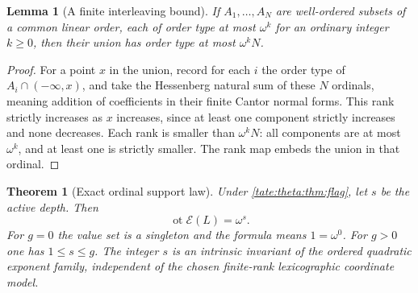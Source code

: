 \documentclass[11pt,letterpaper]{article}
\newtheorem{theorem}{Theorem}[section]
\newtheorem{lemma}[lemma]{Lemma}
\theoremstyle{definition}
\newcommand{\ordtype}{\operatorname{ot}}
\newcommand{\cE}{\mathcal E}
\begin{document}
\begin{lemma}[A finite interleaving bound]\label{tate:theta:lem:shuffle}
If $A_1,\ldots,A_N$ are well-ordered subsets of a common linear order, each
of order type at most $\omega^k$ for an ordinary integer $k\ge0$, then their
union has order type at most $\omega^kN$.
\end{lemma}

\begin{proof}
For a point $x$ in the union, record for each $i$ the order type of
$A_i\cap(-\infty,x)$, and take the Hessenberg natural sum of these $N$
ordinals, meaning addition of coefficients in their finite Cantor normal
forms. This rank strictly increases as $x$ increases, since at least one
component strictly increases and none decreases. Each rank is smaller than
$\omega^kN$: all components are at most $\omega^k$, and at least one is
strictly smaller. The rank map embeds the union in that ordinal.
\end{proof}

\begin{theorem}[Exact ordinal support law]\label{tate:theta:thm:ordinal}
Under \cref{tate:theta:thm:flag}, let $s$ be the active depth. Then
\begin{equation}
 \ordtype\cE(L)=\omega^s.\label{tate:theta:eq:ordinal}
\end{equation}
For $g=0$ the value set is a singleton and the formula means $1=\omega^0$.
For $g>0$ one has $1\le s\le g$. The integer $s$ is an intrinsic invariant
of the ordered quadratic exponent family, independent of the chosen
finite-rank lexicographic coordinate model.
\end{theorem}
\end{document}
